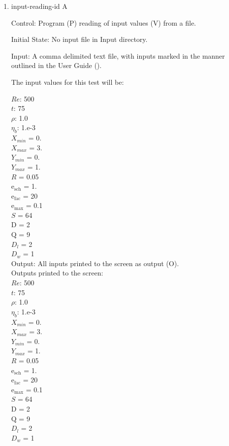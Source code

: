 \documentclass[12pt, titlepage]{article}
\newcounter{testcounter} %
\begin{document}
\begin{enumerate}

\item{input-reading-id\thetestcounter
    A \label{inputreadingtest}}

  Control: Program (P) reading of input values (V) from a file.
				
  Initial State: No input file in Input directory. 
					
  Input: A comma delimited text file, with inputs marked in the manner outlined
  in the User Guide (\citet{LBM_UserGuide_PM}).

  The input values for this test will be:

  $Re$: 500\\ 
  $t$: 75\\
  $\rho$: 1.0\\
  $\eta_b$: 1.e-3\\
  $X_{min}$ = 0.\\
  $X_{max}$ = 3.\\
  $Y_{min}$ = 0.\\
  $Y_{max}$ = 1.\\
  $R$ = 0.05\\
  $\mathrm{e_{sch}}$ = 1.\\
  $\mathrm{e_{fac}}$ = 20\\
  $\mathrm{e_{max}}$ = 0.1\\
  $S$ = 64\\
  $\mathrm{D}$ = 2\\
  $\mathrm{Q}$ = 9\\
  $D_{l}$ = 2\\
  $D_{w}$ = 1\\

					
Output: All inputs printed to the screen as output (O).\\
Outputs printed to the screen:\\
$Re$: 500\\
$t$: 75\\
$\rho$: 1.0\\
$\eta_b$: 1.e-3\\
$X_{min}$ = 0.\\
$X_{max}$ = 3.\\
$Y_{min}$ = 0.\\
$Y_{max}$ = 1.\\
$R$ = 0.05\\
$\mathrm{e_{sch}}$ = 1.\\
$\mathrm{e_{fac}}$ = 20\\
$\mathrm{e_{max}}$ = 0.1\\
$S$ = 64\\
$\mathrm{D}$ = 2\\
$\mathrm{Q}$ = 9\\
$D_{l}$ = 2\\
$D_{w}$ = 1\\


\end{enumerate}
\end{document}
